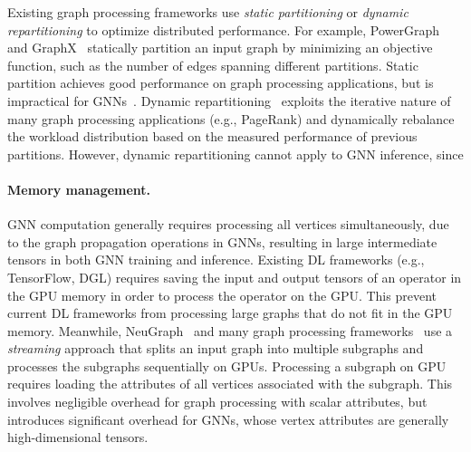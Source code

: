 Existing graph processing frameworks use {\em static partitioning} or {\em dynamic repartitioning} to optimize distributed performance.
%
For example, PowerGraph~\cite{PowerGraph} and GraphX~\cite{GraphX} statically partition an input graph by minimizing an objective function, such as the number of edges spanning different partitions.
Static partition achieves good performance on graph processing applications, but is impractical for GNNs~\cite{Lux}.
%
Dynamic repartitioning~\cite{Presto} exploits the iterative nature of many graph processing applications (e.g., PageRank) and dynamically rebalance the workload distribution based on the measured performance of previous partitions.
However, dynamic repartitioning cannot apply to GNN inference, since 
 
\paragraph{Memory management.}
GNN computation generally requires processing all vertices simultaneously, due to the graph propagation operations in GNNs, resulting in large intermediate tensors in both GNN training and inference.
Existing DL frameworks (e.g., TensorFlow, DGL) requires saving the input and output tensors of an operator in the GPU memory in order to process the operator on the GPU.
This prevent current DL frameworks from processing large graphs that do not fit in the GPU memory.
%
Meanwhile, NeuGraph~\cite{NeuGraph} and many graph processing frameworks~\cite{GTS} use a {\em streaming} approach that splits an input graph into multiple subgraphs and processes the subgraphs sequentially on GPUs.
Processing a subgraph on GPU requires loading the attributes of all vertices associated with the subgraph.
This involves negligible overhead for graph processing with scalar attributes, but introduces significant overhead for GNNs, whose vertex attributes are generally high-dimensional tensors.

